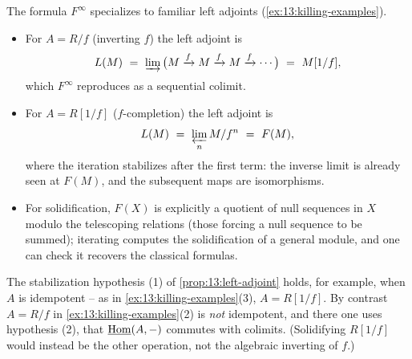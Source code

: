 \begin{remark}
\label{rmk:13:classical-formulas}
The formula $F^\infty$ specializes to familiar left adjoints
(\cref{ex:13:killing-examples}).
\begin{itemize}
\item For $A=R/f$ (inverting $f$) the left adjoint is
\begin{equation*}
L(M)\ =\ \varinjlim\big(M\xrightarrow{f}M\xrightarrow{f}M\xrightarrow{f}\cdots\big)\ =\ M[1/f],
\end{equation*}
which $F^\infty$ reproduces as a sequential colimit.
\item For $A=R[1/f]$ ($f$-completion) the left adjoint is
\begin{equation*}
L(M)\ =\ \varprojlim_n M/f^n\ =\ F(M),
\end{equation*}
where the iteration stabilizes after the first term: the inverse limit is
already seen at $F(M)$, and the subsequent maps are isomorphisms.
\item For solidification, $F(X)$ is explicitly a quotient of null sequences in
$X$ modulo the telescoping relations (those forcing a null sequence to be summed);
iterating computes the solidification of a general module, and one can check it
recovers the classical formulas.
\end{itemize}
\end{remark}

\begin{remark}
\label{rmk:13:idempotent}
The stabilization hypothesis (1) of \cref{prop:13:left-adjoint} holds, for
example, when $A$ is idempotent -- as in \cref{ex:13:killing-examples}(3),
$A=R[1/f]$. By contrast $A=R/f$ in \cref{ex:13:killing-examples}(2) is
\emph{not} idempotent, and there one uses hypothesis (2), that $\underline{\operatorname{Hom}}(A,-)$
commutes with colimits. (Solidifying $R[1/f]$ would instead be the other
operation, not the algebraic inverting of $f$.)
\end{remark}
